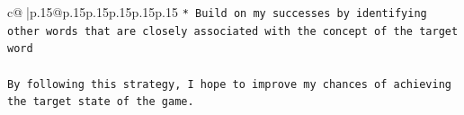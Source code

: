 \documentclass{article}
\begin{document}
{\begin{supertabular}{c@{$\;$}|p{.15\linewidth}@{}p{.15\linewidth}p{.15\linewidth}p{.15\linewidth}p{.15\linewidth}p{.15\linewidth}}
{{{\texttt{* Build on my successes by identifying other words that are closely associated with the concept of the target word} \\
\\ 
\texttt{By following this strategy, I hope to improve my chances of achieving the target state of the game.} \\
            }
        }
    }
     \\ \\

\end{supertabular}
}
\end{document}
